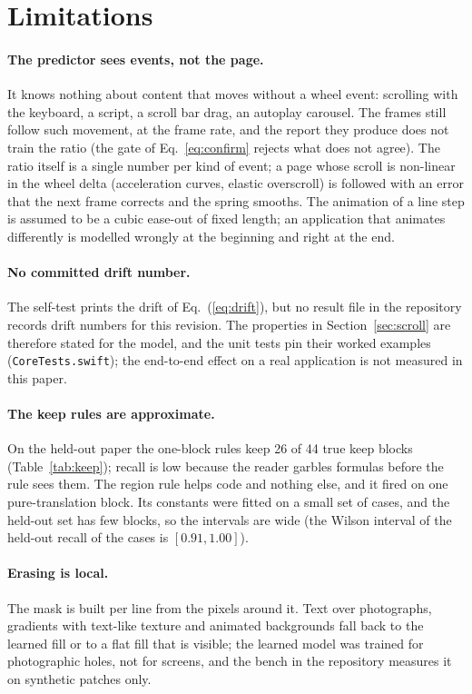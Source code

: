 \section{Limitations}\label{sec:limits}

\paragraph{The predictor sees events, not the page.} It knows nothing about content that moves without a wheel event: scrolling with the
keyboard, a script, a scroll bar drag, an autoplay carousel. The frames still follow such movement, at the frame rate, and the report they produce
does not train the ratio (the gate of Eq.~\ref{eq:confirm} rejects what does not agree). The ratio itself is a single number per kind of event; a page whose
scroll is non-linear in the wheel delta (acceleration curves, elastic overscroll) is followed with an error that the next frame corrects and the spring
smooths. The animation of a line step is assumed to be a cubic ease-out of fixed length; an application that animates differently is
modelled wrongly at the beginning and right at the end.

\paragraph{No committed drift number.} The self-test prints the drift of Eq.~(\ref{eq:drift}), but no result file in the repository records drift numbers for this
revision. The properties in Section~\ref{sec:scroll} are therefore stated for the model, and the unit tests pin their worked examples
(\texttt{CoreTests.swift}); the end-to-end effect on a real application is not measured in this paper.

\paragraph{The keep rules are approximate.} On the held-out paper the one-block rules keep 26 of 44 true keep blocks (Table~\ref{tab:keep}); recall
is low because the reader garbles formulas before the rule sees them. The region rule helps code and nothing else, and it fired on one pure-translation block. Its constants
were fitted on a small set of cases, and the held-out set has few blocks, so the intervals are wide (the Wilson interval of the held-out recall of the cases is $[0.91,1.00]$).

\paragraph{Erasing is local.} The mask is built per line from the pixels around it. Text over photographs, gradients with text-like texture and
animated backgrounds fall back to the learned fill or to a flat fill that is visible; the learned model was trained for photographic holes, not for screens, and the bench in
the repository measures it on synthetic patches only.

